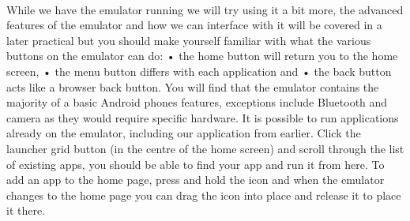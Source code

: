 \documentclass[12pt, a4paper, twoside]{book}
\begin{document}
\paragraph{} While we have the emulator running we will try using it a bit more, the advanced features of the emulator and how we can interface with it will be covered in a later practical but you should make yourself familiar with what the various buttons on the emulator can do:
•	the home button will return you to the home screen, 
•	the menu button differs with each application and 
•	the back button acts like a browser back button. You will find that the emulator contains the majority of a basic Android phones features, exceptions include Bluetooth and camera as they would require specific hardware.
It is possible to run applications already on the emulator, including our application from earlier. Click the launcher grid button (in the centre of the home screen) and scroll through the list of existing apps, you should be able to find your app and run it from here. To add an app to the home page, press and hold the icon and when the emulator changes to the home page you can drag the icon into place and release it to place it there.
\end{document}
